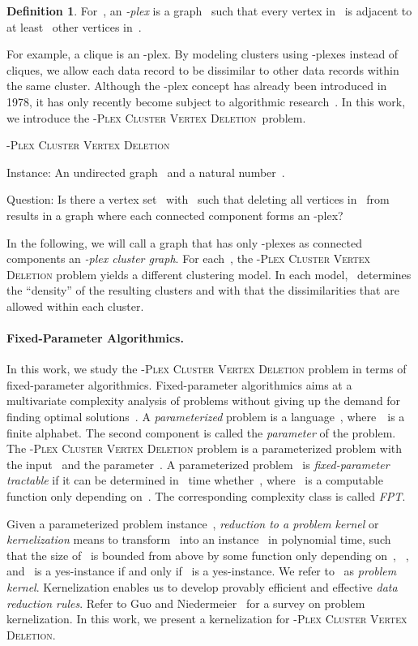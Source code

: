 \documentclass[12pt, a4paper, abstracton]{scrreprt}
\renewcommand{\cite}{~\citep}
\newcommand{\name}{\textsc}
\newcommand{\pvd}[1]{\name{\mbox{-Plex} Cluster Vertex Deletion}}
\newcommand{\pl}[1]{\mbox{-plex}}
\newcommand{\pcg}[1]{\pl #1 cluster graph}
\newcounter{theorem}
\newcommand{\decprob}[3]{\begin{flushright}
\addtolength{\linewidth}{-1em}
\begin{minipage}{\linewidth}
\textsc{#1}
\begin{compactdesc}
\item[\hspace{\parindent}Instance:] #2
\item[\hspace{\parindent}Question:] #3
\end{compactdesc}  
\end{minipage}
\addtolength{\linewidth}{1em}
\end{flushright}
}
\theoremstyle{definition}
\newtheorem{definition}{Definition}[chapter]
\theoremstyle{remark}
\begin{document}
\begin{definition}
  For~, an \emph{-plex} is a graph~ such that every
  vertex in~ is adjacent to at least ~other vertices in~.
\end{definition}

\noindent For example, a clique is an \pl1. By modeling clusters using \pl{s}es instead of cliques, we allow each data record to be dissimilar to  other data records within the same cluster.  Although the \pl s concept has already been introduced in 1978, it has only recently become subject to algorithmic research\cite{BBH09,DBLP:conf/aaim/GuoKNU09,MH09,MNS09,WP07}. In this work, we introduce the \pvd s~problem.

\decprob{\pvd s}{An undirected
  graph~ and a natural number~.}{Is there a vertex
  set~ with~ such that deleting all vertices
  in~ from~ results in a graph where each connected component
  forms an \pl s?}

\noindent In the following, we will call a graph that has only \pl ses
as connected components an \emph{\pcg s}.  For each~, the \pvd s
problem yields a different clustering model. In each model,
~determines the ``density'' of the resulting clusters and with that
the dissimilarities that are allowed within each cluster.

\paragraph{Fixed-Parameter Algorithmics.}
In this work, we study the \pvd s problem in terms of fixed-parameter algorithmics. Fixed-parameter algorithmics aims at a multivariate complexity analysis of problems without giving up the demand for finding optimal solutions\cite{DF99,Flu06,Nie06}. A \emph{parameterized} problem is a language~, where~~is a finite alphabet. The second component is called the \emph{parameter} of the problem. The \pvd s problem is a parameterized problem with the input~ and the parameter~. A parameterized problem~ is \emph{fixed-parameter tractable} if it can be determined in ~time whether~, where~ is a computable function only depending on~. The corresponding complexity class is called \emph{FPT}.

Given a parameterized problem instance~, \emph{reduction to a problem kernel} or \emph{kernelization} means to transform~ into an instance~ in polynomial time, such that the size of~ is bounded from above by some function only depending on~, ~, and~ is a yes-instance if and only if~ is a yes-instance. We refer to~ as \emph{problem kernel}. Kernelization enables us to develop provably efficient and effective \emph{data reduction rules}. Refer to Guo and Niedermeier\cite{GN07SIGACT} for a survey on problem kernelization. In this work, we present a kernelization for \pvd s.
\end{document}
